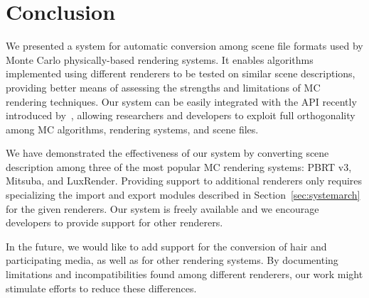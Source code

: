 \chapter{Conclusion}
\label{sec:conclusion}
We presented a system for automatic conversion among scene file formats used by Monte Carlo physically-based rendering systems. 
It enables algorithms implemented using different renderers to be tested on similar scene descriptions, providing better means of assessing the strengths and limitations of MC rendering techniques. 
%
Our system can be easily integrated with the API recently introduced by~\cite{Santos:2018:FBKSD}, allowing researchers and developers to exploit full orthogonality among MC algorithms, rendering systems, and scene files.   

We have demonstrated the effectiveness of our system by converting scene description among three of the most popular MC rendering systems: PBRT v3, Mitsuba, and LuxRender. Providing support to additional renderers only requires specializing the import and export modules described in Section~\ref{sec:systemarch} for the given renderers. Our system is freely available and we encourage developers to provide support for other renderers.  

In the future, we would like to add support for the conversion of hair and participating media, as well as for other rendering systems.
By documenting limitations and incompatibilities found among different renderers, our work might stimulate efforts to reduce these differences.   

